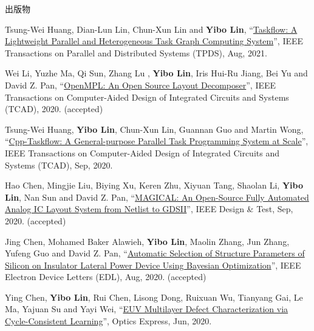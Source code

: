 \begin{rSection}{出版物}
\begin{description}[font=\normalfont]
\item[{[J27]}]{
        Tsung-Wei Huang, Dian-Lun Lin, Chun-Xun Lin and \textbf{Yibo Lin}, 
    ``\href{https://doi.org/10.1109/TPDS.2021.3104255}{Taskflow: A Lightweight Parallel and Heterogeneous Task Graph Computing System}'', 
    IEEE Transactions on Parallel and Distributed Systems (TPDS), Aug, 2021.
    
}
            

\item[{[J26]}]{
        Wei Li, Yuzhe Ma, Qi Sun,  Zhang Lu , \textbf{Yibo Lin}, Iris Hui-Ru Jiang, Bei Yu and David Z. Pan, 
    ``\href{https://doi.org/10.1109/TCAD.2020.3042175}{OpenMPL: An Open Source Layout Decomposer}'', 
    IEEE Transactions on Computer-Aided Design of Integrated Circuits and Systems (TCAD), 2020.
    (accepted)
}
            

\item[{[J25]}]{
        Tsung-Wei Huang, \textbf{Yibo Lin}, Chun-Xun Lin, Guannan Guo and Martin Wong, 
    ``\href{https://doi.org/10.1109/TCAD.2021.3082507}{Cpp-Taskflow: A General-purpose Parallel Task Programming System at Scale}'', 
    IEEE Transactions on Computer-Aided Design of Integrated Circuits and Systems (TCAD), Sep, 2020.
    
}
            

\item[{[J24]}]{
        Hao Chen, Mingjie Liu, Biying Xu, Keren Zhu, Xiyuan Tang, Shaolan Li, \textbf{Yibo Lin}, Nan Sun and David Z. Pan, 
    ``\href{https://doi.org/10.1109/MDAT.2020.3024153}{MAGICAL: An Open-Source Fully Automated Analog IC Layout System from Netlist to GDSII}'', 
    IEEE Design \& Test, Sep, 2020.
    (accepted)
}
            

\item[{[J23]}]{
        Jing Chen, Mohamed Baker Alawieh, \textbf{Yibo Lin}, Maolin Zhang, Jun Zhang, Yufeng Guo and David Z. Pan, 
    ``\href{https://doi.org/10.1109/LED.2020.3013571}{Automatic Selection of Structure Parameters of Silicon on Insulator Lateral Power Device Using Bayesian Optimization}'', 
    IEEE Electron Device Letters (EDL), Aug, 2020.
    (accepted)
}
            

\item[{[J22]}]{
        Ying Chen, \textbf{Yibo Lin}, Rui Chen, Lisong Dong, Ruixuan Wu, Tianyang Gai, Le Ma, Yajuan Su and Yayi Wei, 
    ``\href{https://doi.org/10.1364/OE.394590}{EUV Multilayer Defect Characterization via Cycle-Consistent Learning}'', 
    Optics Express, Jun, 2020.
    
}
\end{description}
\end{rSection}
